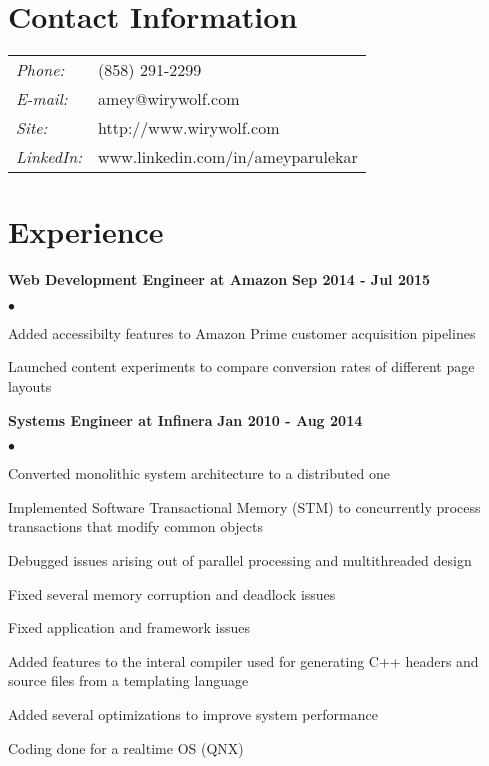 \documentclass[margin,line]{res}
\newenvironment{list2}{
  \begin{list}{$\bullet$}{%
      \setlength{\itemsep}{0in}
      \setlength{\parsep}{0in} \setlength{\parskip}{0in}
      \setlength{\topsep}{0in} \setlength{\partopsep}{0in}
      \setlength{\leftmargin}{0.2in}}}{\end{list}}
\begin{document}

\begin{resume}
\section{\sc Contact Information}
\vspace{.05in}
\begin{tabular}{l l}
{\it Phone:} & (858) 291-2299 \\
{\it E-mail:} & amey@wirywolf.com \\
{\it Site:} & http://www.wirywolf.com \\
{\it LinkedIn:} & www.linkedin.com/in/ameyparulekar \\
\end{tabular}

\section{\sc Experience}

{\bf Web Development Engineer at Amazon} \hfill {\bf Sep 2014 - Jul 2015}\\
\begin{list2}
\item Added accessibilty features to Amazon Prime customer acquisition pipelines
\item Launched content experiments to compare conversion rates of different page layouts
\end{list2}

{\bf Systems Engineer at Infinera} \hfill {\bf Jan 2010 - Aug 2014}\\
\begin{list2}
\item Converted monolithic system architecture to a distributed one
\item Implemented Software Transactional Memory (STM) to concurrently process transactions that modify common objects
\item Debugged issues arising out of parallel processing and multithreaded design
\item Fixed several memory corruption and deadlock issues
\item Fixed application and framework issues
\item Added features to the interal compiler used for generating C++ headers and source files from a templating language
\item Added several optimizations to improve system performance
\item Coding done for a realtime OS (QNX)
\end{list2}


\end{resume}
\end{document}
